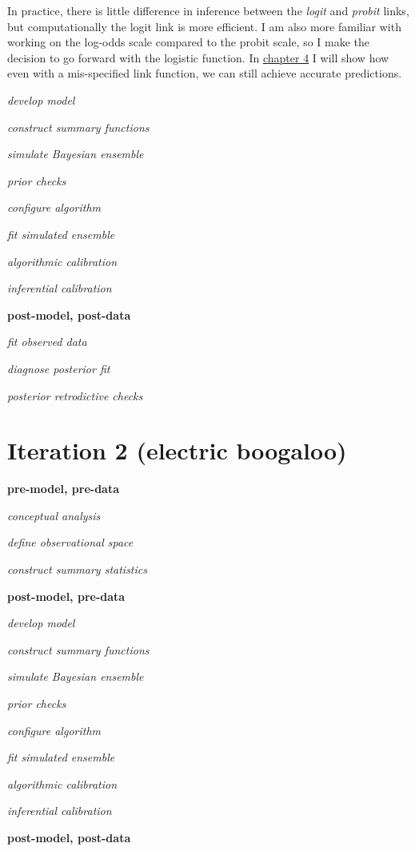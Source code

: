 \documentclass[11pt, oneside, openany]{scrbook}
\begin{document}
In practice, there is little difference in inference between the \emph{logit} and \emph{probit} links, but computationally the logit link is more efficient. I am also more familiar with working on the log-odds scale compared to the probit scale, so I make the decision to go forward with the logistic function. In \protect\hyperlink{model-checking}{chapter 4} I will show how even with a mis-specified link function, we can still achieve accurate predictions.

\emph{develop model}

\emph{construct summary functions}

\emph{simulate Bayesian ensemble}

\emph{prior checks}

\emph{configure algorithm}

\emph{fit simulated ensemble}

\emph{algorithmic calibration}

\emph{inferential calibration}

\textbf{post-model, post-data}

\emph{fit observed data}

\emph{diagnose posterior fit}

\emph{posterior retrodictive checks}

\hypertarget{iter2}{%
\section{Iteration 2 (electric boogaloo)}\label{iter2}}

\textbf{pre-model, pre-data}

\emph{conceptual analysis}

\emph{define observational space}

\emph{construct summary statistics}

\textbf{post-model, pre-data}

\emph{develop model}

\emph{construct summary functions}

\emph{simulate Bayesian ensemble}

\emph{prior checks}

\emph{configure algorithm}

\emph{fit simulated ensemble}

\emph{algorithmic calibration}

\emph{inferential calibration}

\textbf{post-model, post-data}
\end{document}

